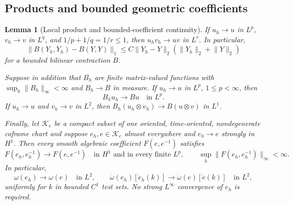\documentclass[11pt]{article}
\numberwithin{equation}{section}
\newtheorem{lemma}[lemma]{Lemma}
\theoremstyle{definition}
\theoremstyle{remark}
\newcommand{\norm}[1]{\lVert#1\rVert}
\begin{document}
\subsection{Products and bounded geometric coefficients}

\begin{lemma}[Local product and bounded-coefficient continuity]
\label{lem:products}
If $u_h\to u$ in $L^p$, $v_h\to v$ in $L^q$, and
$1/p+1/q=1/r\le1$, then $u_hv_h\to uv$ in $L^r$.  In particular,
\begin{equation}
 \norm{B(Y_h,Y_h)-B(Y,Y)}_1
 \le C\norm{Y_h-Y}_2(\norm{Y_h}_2+\norm Y_2)
 \label{eq:quadratic-product}
\end{equation}
for a bounded bilinear contraction $B$.

Suppose in addition that $B_h$ are finite matrix-valued functions with
$\sup_h\norm{B_h}_\infty<\infty$ and $B_h\to B$ in measure.  If
$u_h\to u$ in $L^p$, $1\le p<\infty$, then
\begin{equation}
 B_hu_h\longrightarrow Bu\quad\text{in }L^p.
 \label{eq:bounded-coefficient-product}
\end{equation}
If $u_h\to u$ and $v_h\to v$ in $L^2$, then
$B_h(u_h\otimes v_h)\to B(u\otimes v)$ in $L^1$.

Finally, let $\mathcal K_e$ be a compact subset of one oriented,
time-oriented, nondegenerate coframe chart and suppose
$e_h,e\in\mathcal K_e$ almost everywhere and $e_h\to e$ strongly in
$H^1$.  Then every smooth algebraic coefficient $F(e,e^{-1})$ satisfies
\begin{equation}
 F(e_h,e_h^{-1})\to F(e,e^{-1})
 \quad\text{in }H^1\text{ and in every finite }L^p,
 \qquad \sup_h\norm{F(e_h,e_h^{-1})}_\infty<\infty.
 \label{eq:bounded-chart-composition}
\end{equation}
In particular,
\begin{equation}
 \omega(e_h)\to\omega(e)\quad\text{in }L^2,
 \qquad
 \dot\omega(e_h)[\dot e_h(k)]\to
 \dot\omega(e)[\dot e(k)]\quad\text{in }L^2,
 \label{eq:spin-connection-convergence}
\end{equation}
uniformly for $k$ in bounded $C^1$ test sets.  No strong
$L^\infty$ convergence of $e_h$ is required.
\end{lemma}
\end{document}
